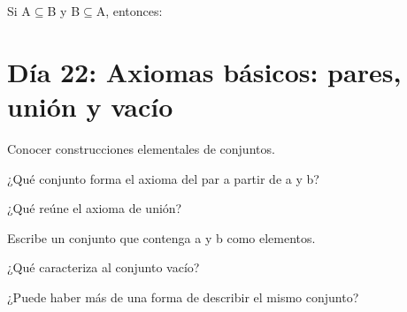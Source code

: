\begin{activity}[id=dia-21-opcion-02,type=choice,weight=1]

Si A\(\subseteq\)B y B\(\subseteq\)A, entonces:





\end{activity}

\section{Día 22: Axiomas básicos: pares, unión y vacío}

\begin{lesson}[id=dia-22-lectura,weight=0]

Conocer construcciones elementales de conjuntos.

\end{lesson}

\begin{activity}[id=dia-22-corta-01,type=short,weight=1]

¿Qué conjunto forma el axioma del par a partir de a y b?

\end{activity}

\begin{activity}[id=dia-22-corta-02,type=short,weight=1]

¿Qué reúne el axioma de unión?

\end{activity}

\begin{activity}[id=dia-22-corta-03,type=short,weight=1]

Escribe un conjunto que contenga a y b como elementos.

\end{activity}

\begin{activity}[id=dia-22-corta-04,type=short,weight=1]

¿Qué caracteriza al conjunto vacío?

\end{activity}

\begin{activity}[id=dia-22-corta-05,type=short,weight=1]

¿Puede haber más de una forma de describir el mismo conjunto?

\end{activity}

